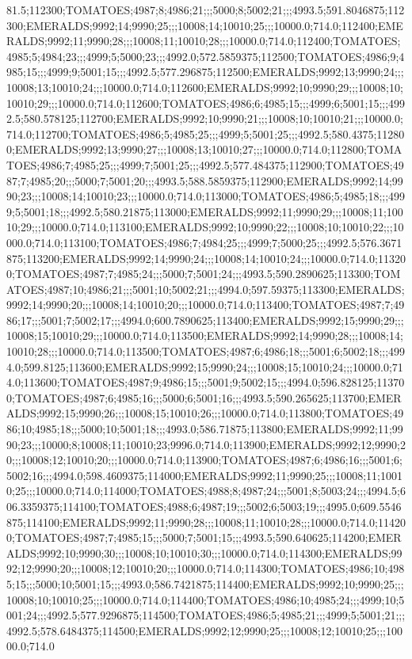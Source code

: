 81.5;112300;TOMATOES;4987;8;4986;21;;;5000;8;5002;21;;;4993.5;591.8046875;112300;EMERALDS;9992;14;9990;25;;;10008;14;10010;25;;;10000.0;714.0;112400;EMERALDS;9992;11;9990;28;;;10008;11;10010;28;;;10000.0;714.0;112400;TOMATOES;4985;5;4984;23;;;4999;5;5000;23;;;4992.0;572.5859375;112500;TOMATOES;4986;9;4985;15;;;4999;9;5001;15;;;4992.5;577.296875;112500;EMERALDS;9992;13;9990;24;;;10008;13;10010;24;;;10000.0;714.0;112600;EMERALDS;9992;10;9990;29;;;10008;10;10010;29;;;10000.0;714.0;112600;TOMATOES;4986;6;4985;15;;;4999;6;5001;15;;;4992.5;580.578125;112700;EMERALDS;9992;10;9990;21;;;10008;10;10010;21;;;10000.0;714.0;112700;TOMATOES;4986;5;4985;25;;;4999;5;5001;25;;;4992.5;580.4375;112800;EMERALDS;9992;13;9990;27;;;10008;13;10010;27;;;10000.0;714.0;112800;TOMATOES;4986;7;4985;25;;;4999;7;5001;25;;;4992.5;577.484375;112900;TOMATOES;4987;7;4985;20;;;5000;7;5001;20;;;4993.5;588.5859375;112900;EMERALDS;9992;14;9990;23;;;10008;14;10010;23;;;10000.0;714.0;113000;TOMATOES;4986;5;4985;18;;;4999;5;5001;18;;;4992.5;580.21875;113000;EMERALDS;9992;11;9990;29;;;10008;11;10010;29;;;10000.0;714.0;113100;EMERALDS;9992;10;9990;22;;;10008;10;10010;22;;;10000.0;714.0;113100;TOMATOES;4986;7;4984;25;;;4999;7;5000;25;;;4992.5;576.3671875;113200;EMERALDS;9992;14;9990;24;;;10008;14;10010;24;;;10000.0;714.0;113200;TOMATOES;4987;7;4985;24;;;5000;7;5001;24;;;4993.5;590.2890625;113300;TOMATOES;4987;10;4986;21;;;5001;10;5002;21;;;4994.0;597.59375;113300;EMERALDS;9992;14;9990;20;;;10008;14;10010;20;;;10000.0;714.0;113400;TOMATOES;4987;7;4986;17;;;5001;7;5002;17;;;4994.0;600.7890625;113400;EMERALDS;9992;15;9990;29;;;10008;15;10010;29;;;10000.0;714.0;113500;EMERALDS;9992;14;9990;28;;;10008;14;10010;28;;;10000.0;714.0;113500;TOMATOES;4987;6;4986;18;;;5001;6;5002;18;;;4994.0;599.8125;113600;EMERALDS;9992;15;9990;24;;;10008;15;10010;24;;;10000.0;714.0;113600;TOMATOES;4987;9;4986;15;;;5001;9;5002;15;;;4994.0;596.828125;113700;TOMATOES;4987;6;4985;16;;;5000;6;5001;16;;;4993.5;590.265625;113700;EMERALDS;9992;15;9990;26;;;10008;15;10010;26;;;10000.0;714.0;113800;TOMATOES;4986;10;4985;18;;;5000;10;5001;18;;;4993.0;586.71875;113800;EMERALDS;9992;11;9990;23;;;10000;8;10008;11;10010;23;9996.0;714.0;113900;EMERALDS;9992;12;9990;20;;;10008;12;10010;20;;;10000.0;714.0;113900;TOMATOES;4987;6;4986;16;;;5001;6;5002;16;;;4994.0;598.4609375;114000;EMERALDS;9992;11;9990;25;;;10008;11;10010;25;;;10000.0;714.0;114000;TOMATOES;4988;8;4987;24;;;5001;8;5003;24;;;4994.5;606.3359375;114100;TOMATOES;4988;6;4987;19;;;5002;6;5003;19;;;4995.0;609.5546875;114100;EMERALDS;9992;11;9990;28;;;10008;11;10010;28;;;10000.0;714.0;114200;TOMATOES;4987;7;4985;15;;;5000;7;5001;15;;;4993.5;590.640625;114200;EMERALDS;9992;10;9990;30;;;10008;10;10010;30;;;10000.0;714.0;114300;EMERALDS;9992;12;9990;20;;;10008;12;10010;20;;;10000.0;714.0;114300;TOMATOES;4986;10;4985;15;;;5000;10;5001;15;;;4993.0;586.7421875;114400;EMERALDS;9992;10;9990;25;;;10008;10;10010;25;;;10000.0;714.0;114400;TOMATOES;4986;10;4985;24;;;4999;10;5001;24;;;4992.5;577.9296875;114500;TOMATOES;4986;5;4985;21;;;4999;5;5001;21;;;4992.5;578.6484375;114500;EMERALDS;9992;12;9990;25;;;10008;12;10010;25;;;10000.0;714.0\n